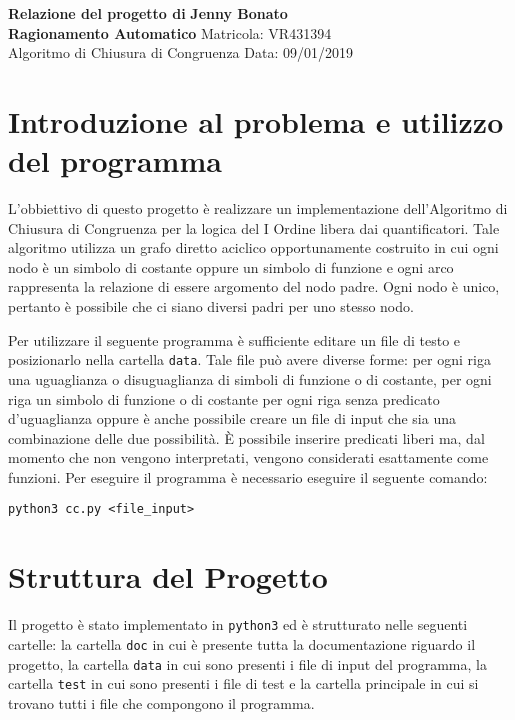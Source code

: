 \documentclass[a4paper, 11pt]{article}
\begin{document}
\noindent
\large\textbf{Relazione del progetto di} \hfill \textbf{Jenny Bonato} \\
\large\textbf{Ragionamento Automatico} \hfill Matricola: VR431394 \\
Algoritmo di Chiusura di Congruenza \hfill Data: 09/01/2019 \\

\section*{Introduzione al problema e utilizzo del programma}
L'obbiettivo di questo progetto è realizzare un implementazione dell'Algoritmo di Chiusura di Congruenza per la logica del I Ordine libera dai quantificatori. Tale algoritmo utilizza un grafo diretto aciclico opportunamente costruito in cui ogni nodo è un simbolo di costante oppure un simbolo di funzione e ogni arco rappresenta la relazione di essere argomento del nodo padre. Ogni nodo è unico, pertanto è possibile che ci siano diversi padri per uno stesso nodo.

Per utilizzare il seguente programma è sufficiente editare un file di testo e posizionarlo nella cartella \verb|data|. 
Tale file può avere diverse forme: per ogni riga una uguaglianza o disuguaglianza di simboli di funzione o di costante, per ogni riga un simbolo di funzione o di costante per ogni riga senza predicato d'uguaglianza oppure è anche possibile creare un file di input che sia una combinazione delle due possibilità. È possibile inserire predicati liberi ma, dal momento che non vengono interpretati, vengono considerati esattamente come funzioni. Per eseguire il programma è necessario eseguire il seguente comando:
\begin{verbatim}
python3 cc.py <file_input>
\end{verbatim} 

\section*{Struttura del Progetto}
Il progetto è stato implementato in \verb|python3| ed è strutturato nelle seguenti cartelle: la cartella \verb|doc| in cui è presente tutta la documentazione riguardo il progetto, la cartella \verb|data| in cui sono presenti i file di input del programma, la cartella \verb|test| in cui sono presenti i file di test e la cartella principale in cui si trovano tutti i file che compongono il programma.
\end{document}
